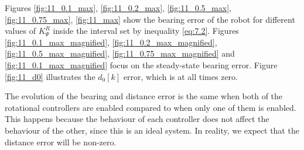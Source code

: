 Figures \ref{fig:11_0.1_max}, \ref{fig:11_0.2_max}, \ref{fig:11_0.5_max},
\ref{fig:11_0.75_max}, \ref{fig:11_max} show the bearing error of the robot
for different values of $K_{\Psi}^R$ inside the interval set by inequality
\ref{eq:7.2}. Figures \ref{fig:11_0.1_max_magnified},
\ref{fig:11_0.2_max_magnified}, \ref{fig:11_0.5_max_magnified},
\ref{fig:11_0.75_max_magnified} and \ref{fig:11_0.1_max_magnified} focus on the
steady-state bearing error. Figure \ref{fig:11_d0} illustrates the $d_0[k]$
error, which is at all times zero.

The evolution of the bearing and distance error is the same when both of the
rotational controllers are enabled compared to when only one of them is enabled.
This happens because the behaviour of each controller does not affect the
behaviour of the other, since this is an ideal system. In reality, we expect
that the distance error will be non-zero.

\noindent{}

\noindent{}

